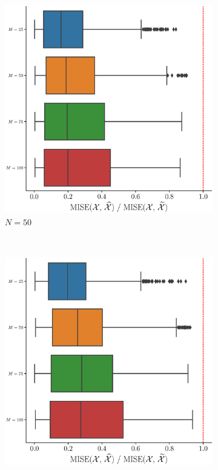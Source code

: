 \begin{results}
\begin{figure}
\begin{subfigure}[b]{0.49\textwidth}
         \includegraphics[width=\textwidth]{figures/scenario_2/mise_N50.eps}
         \caption{$N = 50$}
         \label{fig:mise_mfd_2d_50}
     \end{subfigure}
     \\
     \begin{subfigure}[b]{0.49\textwidth}
         \centering
         \includegraphics[width=\textwidth]{figures/scenario_2/mise_N75.eps}

\end{subfigure}
\end{figure}
\end{results}
